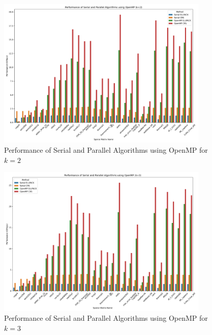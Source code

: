 \documentclass[12pt,oneside]{book} %
\begin{document}
\begin{figure}[H]
    \centering
    \includegraphics[width=0.9\textwidth]{../results/images/openMP_Performance_k2.png}
    \caption{Performance of Serial and Parallel Algorithms using OpenMP for $k=2$}
    \label{fig:openmp-performance-k2}
\end{figure}

\begin{figure}[H]
    \centering
    \includegraphics[width=0.9\textwidth]{../results/images/openMP_Performance_k3.png}
    \caption{Performance of Serial and Parallel Algorithms using OpenMP for $k=3$}
    \label{fig:openmp-performance-k3}
\end{figure}
\end{document}

